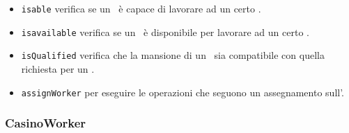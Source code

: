 \begin{itemize}
\begin{itemize}
        \item \texttt{is\textunderscore able} verifica se un \items\ è capace di lavorare ad un certo \task.
        \item \texttt{is\textunderscore available} verifica se un \items\ è disponibile per lavorare ad un certo \task.
        \item \texttt{isQualified} verifica che la mansione di un \items\ sia compatibile con quella richiesta per un \task.
        \item \texttt{assignWorker} per eseguire le operazioni che seguono un assegnamento sull'\items.
    \end{itemize}
\end{itemize}
    
\subsubsection{CasinoWorker}
